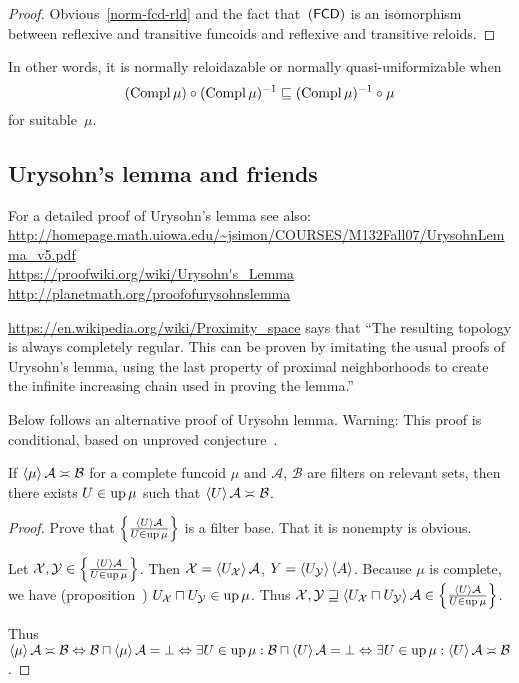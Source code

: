 \begin{proof}
Obvious~\ref{norm-fcd-rld} and the fact that~$(\mathsf{FCD})$ is an isomorphism between reflexive and transitive funcoids
and reflexive and transitive reloids.
\end{proof}

In other words, it is normally reloidazable or normally quasi-uniformizable when
\[ (\operatorname{Compl}\mu)\circ(\operatorname{Compl}\mu)^{-1}\sqsubseteq(\operatorname{Compl}\mu)^{-1}\circ\mu \]
for suitable~$\mu$.

\subsection{Urysohn's lemma and friends}

For a detailed proof of Urysohn's lemma see also:\\
\url{http://homepage.math.uiowa.edu/~jsimon/COURSES/M132Fall07/UrysohnLemma_v5.pdf}\\
\url{https://proofwiki.org/wiki/Urysohn's_Lemma}\\
\url{http://planetmath.org/proofofurysohnslemma}

\url{https://en.wikipedia.org/wiki/Proximity_space} says that
``The resulting topology is always completely regular. This can be proven by imitating the usual proofs of Urysohn's lemma, using the last property of proximal neighborhoods to create the infinite increasing chain used in proving the lemma.''

Below follows an alternative proof of Urysohn lemma. Warning: This proof is conditional,
based on unproved conjecture~.

\begin{lem}
  If $\left\langle \mu\right\rangle \mathcal{A} \asymp \mathcal{B}$ for a complete
  funcoid $\mu$ and $\mathcal{A}$, $\mathcal{B}$ are filters on relevant
  sets, then there exists $U \in \operatorname{up} \mu$ such that $\left\langle U\right\rangle \mathcal{A} \asymp \mathcal{B}$.
\end{lem}

\begin{proof}
  Prove that $\left\{ \frac{ \left\langle U\right\rangle \mathcal{A} }{
  U \in \operatorname{up} \mu }\right\}$ is a filter base. That it
  is nonempty is obvious.
  
  Let $\mathcal{X}, \mathcal{Y} \in \left\{ \frac{ \left\langle U\right\rangle \mathcal{A}
  }{ U \in \operatorname{up} \mu }\right\}$. Then
  $\mathcal{X} = \left\langle U_{\mathcal{X}}\right\rangle \mathcal{A}$, $Y = \left\langle 
  U_{\mathcal{Y}}\right\rangle \left\langle A\right\rangle$. Because $\mu$ is complete, we have
  (proposition~) $U_{\mathcal{X}} \sqcap U_{\mathcal{Y}} \in \operatorname{up}
  \mu$. Thus $\mathcal{X}, \mathcal{Y} \sqsupseteq \left\langle 
  U_{\mathcal{X}} \sqcap U_{\mathcal{Y}} \right\rangle \mathcal{A} \in \left\{ \frac{
  \left\langle U\right\rangle \mathcal{A} }{ U \in \operatorname{up} \mu }\right\}$.
  
  Thus $\left\langle \mu\right\rangle \mathcal{A} \asymp \mathcal{B}
  \Leftrightarrow \mathcal{B} \sqcap \left\langle \mu\right\rangle \mathcal{A} =
  \bot \Leftrightarrow \exists U \in \operatorname{up} \mu: \mathcal{B} \sqcap
  \left\langle U\right\rangle \mathcal{A} = \bot \Leftrightarrow \exists U \in \operatorname{up}
  \mu: \left\langle U\right\rangle \mathcal{A} \asymp \mathcal{B}$.
\end{proof}

